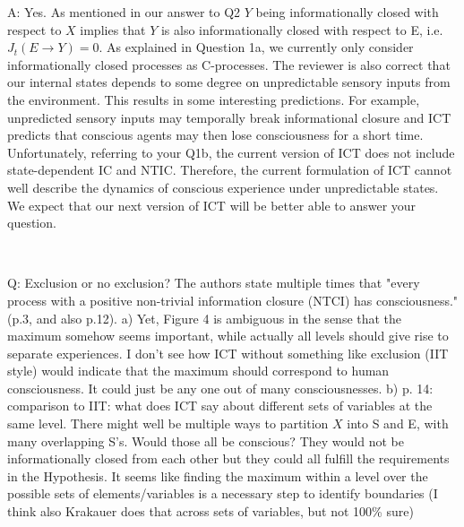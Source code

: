 \documentclass[utf8]{article}
\newcounter{cQuestion}[section]
\newenvironment{question}
    {\refstepcounter{cQuestion}\color{Blue}\noindent\newline Q\thecQuestion:}
    {~\newline}
\newenvironment{ans}  
    {\color{Black}\noindent A:}
    {~\newline}
\begin{document}
        \begin{ans}
            Yes. As mentioned in our answer to Q2 $Y$ being informationally closed with respect to $X$ implies that $Y$ is also informationally closed with respect to E, i.e. $J_t(E\rightarrow Y) = 0$.
            As explained in Question 1a, we currently only consider informationally closed processes as C-processes. The reviewer is also correct that our internal states depends to some degree on unpredictable sensory inputs from the environment. This results in some interesting predictions. For example, unpredicted sensory inputs may temporally break informational closure and ICT predicts that conscious agents may then lose consciousness for a short time. Unfortunately, referring to your Q1b, the current version of ICT does not include state-dependent IC and NTIC. Therefore, the current formulation of ICT cannot well describe the dynamics of conscious experience under unpredictable states. We expect that our next version of ICT will be better able to answer your question. 
            
        \end{ans}
        

        \begin{question}
            Exclusion or no exclusion? The authors state multiple times that "every process with a positive non-trivial information closure (NTCI) has consciousness." (p.3, and also p.12).
            a) Yet, Figure 4 is ambiguous in the sense that the maximum somehow seems important, while actually all levels should give rise to separate experiences. I don't see how ICT without something like exclusion (IIT style) would indicate that the maximum should correspond to human consciousness. It could just be any one out of many consciousnesses.
            b) p. 14: comparison to IIT: what does ICT say about different sets of variables at the same level. There might well be multiple ways to partition $X$ into S and E, with many overlapping S's. Would those all be conscious? They would not be informationally closed from each other but they could all fulfill the requirements in the Hypothesis. It seems like finding the maximum within a level over the possible sets of elements/variables is a necessary step to identify boundaries (I think also Krakauer does that across sets of variables, but not 100\% sure)        
        \end{question}
    
\end{document}
